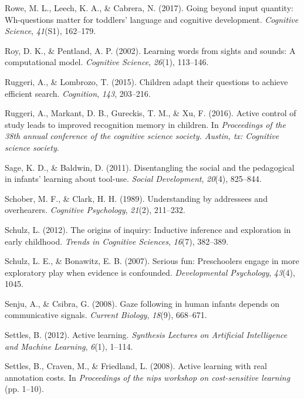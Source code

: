 \documentclass[oneside]{report}
\begin{document}
\leavevmode\hypertarget{ref-rowe2017going}{}%
Rowe, M. L., Leech, K. A., \& Cabrera, N. (2017). Going beyond input
quantity: Wh-questions matter for toddlers' language and cognitive
development. \emph{Cognitive Science}, \emph{41}(S1), 162--179.

\leavevmode\hypertarget{ref-roy2002learning}{}%
Roy, D. K., \& Pentland, A. P. (2002). Learning words from sights and
sounds: A computational model. \emph{Cognitive Science}, \emph{26}(1),
113--146.

\leavevmode\hypertarget{ref-ruggeri2015children}{}%
Ruggeri, A., \& Lombrozo, T. (2015). Children adapt their questions to
achieve efficient search. \emph{Cognition}, \emph{143}, 203--216.

\leavevmode\hypertarget{ref-ruggeri2016active}{}%
Ruggeri, A., Markant, D. B., Gureckis, T. M., \& Xu, F. (2016). Active
control of study leads to improved recognition memory in children. In
\emph{Proceedings of the 38th annual conference of the cognitive science
society. Austin, tx: Cognitive science society}.

\leavevmode\hypertarget{ref-sage2011disentangling}{}%
Sage, K. D., \& Baldwin, D. (2011). Disentangling the social and the
pedagogical in infants' learning about tool-use. \emph{Social
Development}, \emph{20}(4), 825--844.

\leavevmode\hypertarget{ref-schober1989understanding}{}%
Schober, M. F., \& Clark, H. H. (1989). Understanding by addressees and
overhearers. \emph{Cognitive Psychology}, \emph{21}(2), 211--232.

\leavevmode\hypertarget{ref-schulz2012origins}{}%
Schulz, L. (2012). The origins of inquiry: Inductive inference and
exploration in early childhood. \emph{Trends in Cognitive Sciences},
\emph{16}(7), 382--389.

\leavevmode\hypertarget{ref-schulz2007serious}{}%
Schulz, L. E., \& Bonawitz, E. B. (2007). Serious fun: Preschoolers
engage in more exploratory play when evidence is confounded.
\emph{Developmental Psychology}, \emph{43}(4), 1045.

\leavevmode\hypertarget{ref-senju2008gaze}{}%
Senju, A., \& Csibra, G. (2008). Gaze following in human infants depends
on communicative signals. \emph{Current Biology}, \emph{18}(9),
668--671.

\leavevmode\hypertarget{ref-settles2012active}{}%
Settles, B. (2012). Active learning. \emph{Synthesis Lectures on
Artificial Intelligence and Machine Learning}, \emph{6}(1), 1--114.

\leavevmode\hypertarget{ref-settles2008active}{}%
Settles, B., Craven, M., \& Friedland, L. (2008). Active learning with
real annotation costs. In \emph{Proceedings of the nips workshop on
cost-sensitive learning} (pp. 1--10).
\end{document}
